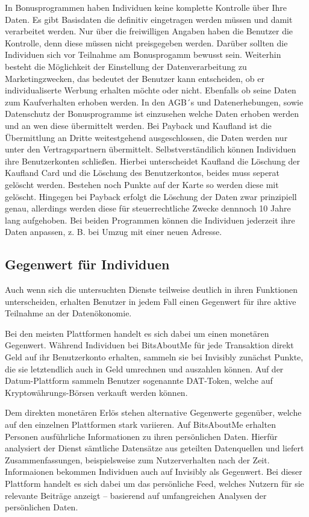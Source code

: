 \noindent In Bonusprogrammen haben Individuen keine komplette Kontrolle über Ihre Daten. Es gibt Basisdaten die definitiv eingetragen werden müssen und damit verarbeitet werden. Nur über die freiwilligen Angaben haben die Benutzer die Kontrolle, denn diese müssen nicht preisgegeben werden. Darüber sollten die Individuen sich vor Teilnahme am Bonusprogamm bewusst sein. Weiterhin besteht die Möglichkeit der Einstellung der Datenverarbeitung zu Marketingzwecken, das bedeutet der Benutzer kann entscheiden, ob er individualiserte Werbung erhalten möchte oder nicht. Ebenfalls ob seine Daten zum Kaufverhalten erhoben werden. In den AGB´s und Datenerhebungen, sowie Datenschutz der Bonusprogramme ist einzusehen welche Daten erhoben werden und an wen diese übermittelt werden. Bei Payback und Kaufland ist die Übermittlung an Dritte weitestgehend ausgeschlossen, die Daten werden nur unter den Vertragspartnern übermittelt. Selbstverständilich können Individuen ihre Benutzerkonten schließen. Hierbei unterscheidet Kaufland die Löschung der Kaufland Card und die Löschung des Benutzerkontos, beides muss seperat gelöscht werden. Bestehen noch Punkte auf der Karte so werden diese mit gelöscht. Hingegen bei Payback erfolgt die Löschung der Daten zwar prinzipiell genau, allerdings werden diese für steuerrechtliche Zwecke dennnoch 10 Jahre lang aufgehoben. Bei beiden Programmen können die Individuen jederzeit ihre Daten anpassen, z. B. bei Umzug mit einer neuen Adresse.

\subsection{Gegenwert für Individuen}
Auch wenn sich die untersuchten Dienste teilweise deutlich in ihren Funktionen unterscheiden, erhalten Benutzer in jedem Fall einen Gegenwert für ihre aktive Teilnahme an der Datenökonomie. \newline

\noindent Bei den meisten Plattformen handelt es sich dabei um einen monetären Gegenwert. Während Individuen bei BitsAboutMe für jede Transaktion direkt Geld auf ihr Benutzerkonto erhalten, sammeln sie bei Invisibly zunächst Punkte, die sie letztendlich auch in Geld umrechnen und auszahlen können. Auf der Datum-Plattform sammeln Benutzer sogenannte DAT-Token, welche auf Kryptowährungs-Börsen verkauft werden können. \newline

\noindent Dem direkten monetären Erlös stehen alternative Gegenwerte gegenüber, welche auf den einzelnen Plattformen stark variieren. Auf BitsAboutMe erhalten Personen ausführliche Informationen zu ihren persönlichen Daten. Hierfür analysiert der Dienst sämtliche Datensätze aus geteilten Datenquellen und liefert Zusammenfassungen, beispielsweise zum Nutzerverhalten nach der Zeit. Informaionen bekommen Individuen auch auf Invisibly als Gegenwert. Bei dieser Plattform handelt es sich dabei um das persönliche Feed, welches Nutzern für sie relevante Beiträge anzeigt -- basierend auf umfangreichen Analysen der persönlichen Daten. \newline

